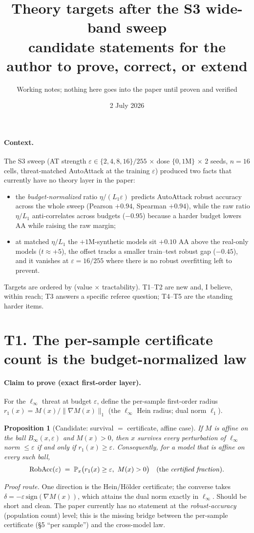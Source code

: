 \documentclass[11pt]{article}
\title{Theory targets after the S3 wide-band sweep\\
\large candidate statements for the author to prove, correct, or extend}
\author{Working notes; nothing here goes into the paper until proven and verified}
\date{2 July 2026}
\newtheorem{proposition}{Proposition}
\theoremstyle{definition}
\newcommand{\Prob}{\mathbb{P}}
\begin{document}
\maketitle

\paragraph{Context.} The S3 sweep (AT strength $\varepsilon\in\{2,4,8,16\}/255$ $\times$ dose
$\{0,1\mathrm M\}$ $\times$ 2 seeds, $n=16$ cells, threat-matched AutoAttack at the training
$\varepsilon$) produced two facts that currently have no theory layer in the paper:
\begin{itemize}
\item[(F1)] the \emph{budget-normalized} ratio $\eta/(L_1\varepsilon)$ predicts AutoAttack robust
accuracy across the whole sweep (Pearson $+0.94$, Spearman $+0.94$), while the raw ratio
$\eta/L_1$ anti-correlates across budgets ($-0.95$) because a harder budget lowers AA while raising
the raw margin;
\item[(F2)] at matched $\eta/L_1$ the $+1$M-synthetic models sit $+0.10$ AA above the real-only
models ($t\approx+5$), the offset tracks a smaller train--test robust gap ($-0.45$), and it vanishes
at $\varepsilon=16/255$ where there is no robust overfitting left to prevent.
\end{itemize}
Targets are ordered by (value $\times$ tractability). T1--T2 are new and, I believe, within reach;
T3 answers a specific referee question; T4--T5 are the standing harder items.

\section*{T1. The per-sample certificate count is the budget-normalized law}

\paragraph{Claim to prove (exact first-order layer).}
For the $\ell_\infty$ threat at budget $\varepsilon$, define the per-sample first-order radius
$r_1(x)=M(x)/\|\nabla M(x)\|_1$ (the $\ell_\infty$ Hein radius; dual norm $\ell_1$).

\begin{proposition}[Candidate: survival $=$ certificate, affine case]\label{prop:count}
If $M$ is affine on the ball $B_\infty(x,\varepsilon)$ and $M(x)>0$, then
$x$ survives every perturbation of $\ell_\infty$ norm $\le\varepsilon$ if and only if
$r_1(x)\ge\varepsilon$. Consequently, for a model that is affine on every such ball,
\[
\mathrm{RobAcc}(\varepsilon)\;=\;\Prob_x\big(r_1(x)\ge\varepsilon,\ M(x)>0\big)
\quad\text{(the \emph{certified fraction}).}
\]
\end{proposition}
\noindent\emph{Proof route.} One direction is the Hein/H\"older certificate; the converse takes
$\delta=-\varepsilon\,\mathrm{sign}(\nabla M(x))$, which attains the dual norm exactly in
$\ell_\infty$. Should be short and clean. The paper currently has no statement at the
\emph{robust-accuracy} (population count) level; this is the missing bridge between the per-sample
certificate (\S5 ``per sample'') and the cross-model law.
\end{document}
